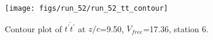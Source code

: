 \begin{figure}[H]
\centering
\texttt{[image: figs/run\_52/run\_52\_tt\_contour]}
\caption{Contour plot of $\overline{t^\prime t^\prime}$ at $z/c$=9.50, $V_{free}$=17.36, station 6.}
\label{fig:run_52_tt_contour}
\end{figure}


